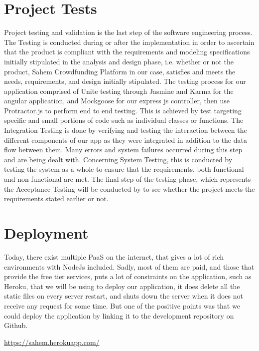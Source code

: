 \section{Project Tests}
Project testing and validation is the last step of the software engineering process. The
Testing is conducted during or after the implementation in order to ascertain that the product is
compliant with the requirements and modeling specifications initially stipulated in the
analysis and design phase, i.e. whether or not the product, Sahem Crowdfunding Platform
in our case, satisfies and meets the needs, requirements, and design initially stipulated.
The testing process for our application comprised of Unite testing through Jasmine and Karma for
the angular application, and Mockgoose for our express js controller, then use Protractor.js to perform
end to end testing.
This is achieved by test targeting specific and small portions of code such as individual classes or
functions. 
The Integration Testing is done by verifying and testing the interaction between the
different components of our app as they were integrated in addition to the data flow between
them.
 Many errors and system failures occurred during this step and are being dealt
with. Concerning System Testing, this is conducted by testing the system as a whole to ensure
that the requirements, both functional and non-functional are met. The final step of the testing
phase, which represents the Acceptance Testing will be conducted by \mentor to see whether the project
meets the requirements stated earlier or not.


\section{Deployment}
% 
Today, there exist multiple PaaS on the internet, that gives a lot of rich environments with NodeJs
included. Sadly, most of them are paid, and those that provide the free tier services, puts a lot
of constraints on the application, such as Heroku, that we will be using to deploy our application,
it does delete all the static files on every server restart, and shuts down the server when it does
not receive any request for some time. But one of the positive points was that we could deploy the
application by linking it to the development repository on Github.


\url{https://sahem.herokuapp.com/}

